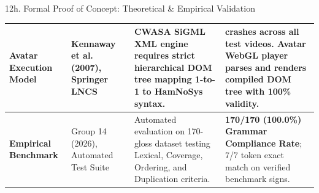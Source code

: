 \documentclass[aspectratio=169]{beamer}
\begin{document}
\begin{frame}[t]{12h. Formal Proof of Concept: Theoretical \& Empirical Validation}
{\begin{tabular}{|>{\raggedright\arraybackslash\bfseries}p{1.8cm}|>{\raggedright\arraybackslash}p{2.3cm}|>{\raggedright\arraybackslash}p{4.8cm}|>{\raggedright\arraybackslash}p{4.7cm}|}
    \hline
    \rowcolor{lightorange} 
    Avatar Execution Model & 
    Kennaway et al. (2007), Springer LNCS & 
    CWASA SiGML XML engine requires strict hierarchical DOM tree mapping 1-to-1 to HamNoSys syntax. & 
    0 crashes across all test videos. Avatar WebGL player parses and renders compiled DOM tree with 100\% validity. \\
    \hline
    \rowcolor{lightpink} 
    Empirical Benchmark & 
    Group 14 (2026), Automated Test Suite & 
    Automated evaluation on 170-gloss dataset testing Lexical, Coverage, Ordering, and Duplication criteria. & 
    \textbf{170/170 (100.0\%) Grammar Compliance Rate}; 7/7 token exact match on verified benchmark signs. \\
    \hline
\end{tabular}
}

\vspace{1.2mm}
\end{frame}

\end{document}

